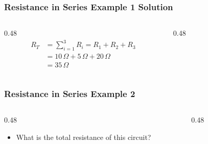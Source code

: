 \begin{frame}
    \frametitle{Resistance in Series Example 1 Solution}
	\begin{columns}
        \begin{column}{0.48\linewidth}
            \[
                \begin{aligned}                        
                    R_T&=\sum_{i=1}^{3}R_i=R_1+R_2+R_3\\
                    &=10\,\Omega + 5\,\Omega + 20\,\Omega\\
                    &=35\,\Omega
                \end{aligned}
            \]
        \end{column}
        \begin{column}{0.48\linewidth}
            \begin{figure}
                \centering
                \resizebox{\columnwidth}{!}{
                    
                }
            \end{figure}
        \end{column}
	\end{columns}
\end{frame}

\begin{frame}
    \frametitle{Resistance in Series Example 2}
	\begin{columns}
        \begin{column}{0.48\linewidth}
            \begin{itemize}
                \item What is the total resistance of this circuit?
            \end{itemize}
        \end{column}
        \begin{column}{0.48\linewidth}
            \begin{figure}
                \centering
                \resizebox{\columnwidth}{!}{
                    
                }
            \end{figure}
        \end{column}
	\end{columns}
\end{frame}

